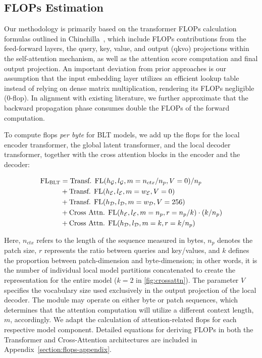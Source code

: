 \subsection{FLOPs Estimation} 
\label{section:flops}

Our methodology is primarily based on the transformer FLOPs calculation formulas outlined in Chinchilla~\citep{hoffmann2022training}, which include FLOPs contributions from the feed-forward layers, the query, key, value, and output (qkvo) projections within the self-attention mechanism, as well as the attention score computation and final output projection. An important deviation from prior approaches is our assumption that the input embedding layer utilizes an efficient lookup table instead of relying on dense matrix multiplication, rendering its FLOPs negligible (0-flop). In alignment with existing literature, we further approximate that the backward propagation phase consumes double the FLOPs of the forward computation.

To compute flops \textit{per byte} for {\textsc BLT} models, we add up the flops for the local encoder transformer, the global latent transformer, and the local decoder transformer, together with the cross attention blocks in the encoder and the decoder:

\begin{align}
    \text{FL}_{\text{{\textsc BLT}}} &= \text{Transf. FL}(h_{\mathcal{G}}, l_{\mathcal{G}}, m=n_{ctx}/n_p, V=0) / n_p\\
   &+ \text{Transf. FL}(h_{\mathcal{E}}, l_{\mathcal{E}}, m=w_{\mathcal{E}}, V=0) \\
   &+ \text{Transf. FL}(h_{\mathcal{D}}, l_{\mathcal{D}}, m=w_{\mathcal{D}}, V=256) \\ 
    &+ \text{Cross Attn. FL}(h_{\mathcal{E}}, l_{\mathcal{E}}, m=n_p, r=n_p/k) \cdot (k/n_p) \\ 
   &+ \text{Cross Attn. FL}(h_{\mathcal{D}}, l_{\mathcal{D}}, m=k, r=k/n_p) 
\end{align}

Here, $n_{ctx}$ refers to the length of the sequence measured in bytes, $n_p$ denotes the patch size, $r$ represents the ratio between queries and key/values, and $k$ defines the proportion between patch-dimension and byte-dimension; in other words, it is the number of individual local model partitions concatenated to create the representation for the entire model ($k=2$ in \autoref{fig:crossattn}). The parameter $V$ specifies the vocabulary size used exclusively in the output projection of the local decoder. The module may operate on either byte or patch sequences, which determines that the attention computation will utilize a different context length, $m$, accordingly. We adapt the calculation of attention-related flops for each respective model component. Detailed equations for deriving FLOPs in both the Transformer and Cross-Attention architectures are included in Appendix~\ref{section:flops-appendix}.

